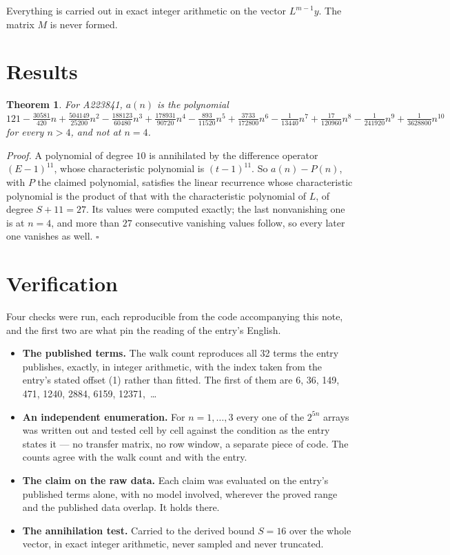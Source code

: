 \documentclass[11pt]{article}
\newtheorem{theorem}{Theorem}
\theoremstyle{definition}
\begin{document}
Everything is carried out in exact integer arithmetic on the vector $L^{m-1}y$. The matrix $M$ is never formed.

\section{Results}

\begin{theorem} For A223841, $a(n)$ is the polynomial $121 - \frac{30581}{420}n + \frac{504149}{25200}n^{2} - \frac{188123}{60480}n^{3} + \frac{178931}{90720}n^{4} - \frac{893}{11520}n^{5} + \frac{3733}{172800}n^{6} - \frac{1}{13440}n^{7} + \frac{17}{120960}n^{8} - \frac{1}{241920}n^{9} + \frac{1}{3628800}n^{10}$ for every $n > 4$, and not at $n = 4$.\end{theorem}

{\itshape Proof.} A polynomial of degree $10$ is annihilated by the difference operator $(E-1)^{11}$, whose characteristic polynomial is $(t-1)^{11}$. So $a(n) - P(n)$, with $P$ the claimed polynomial, satisfies the linear recurrence whose characteristic polynomial is the product of that with the characteristic polynomial of $L$, of degree $S + 11 = 27$. Its values were computed exactly; the last nonvanishing one is at $n = 4$, and more than $27$ consecutive vanishing values follow, so every later one vanishes as well. $\square$

\section{Verification}

Four checks were run, each reproducible from the code accompanying this note, and the first two are what pin the reading of the entry's English.

\begin{itemize}

\item {\bfseries The published terms.} The walk count reproduces all 32 terms the entry publishes, exactly, in integer arithmetic, with the index taken from the entry's stated offset (1) rather than fitted. The first of them are 6, 36, 149, 471, 1240, 2884, 6159, 12371,~\dots

\item {\bfseries An independent enumeration.} For $n = 1,\dots,3$ every one of the $2^{5n}$ arrays was written out and tested cell by cell against the condition as the entry states it --- no transfer matrix, no row window, a separate piece of code. The counts agree with the walk count and with the entry.

\item {\bfseries The claim on the raw data.} Each claim was evaluated on the entry's published terms alone, with no model involved, wherever the proved range and the published data overlap. It holds there.

\item {\bfseries The annihilation test.} Carried to the derived bound $S = 16$ over the whole vector, in exact integer arithmetic, never sampled and never truncated.

\end{itemize}
\end{document}
